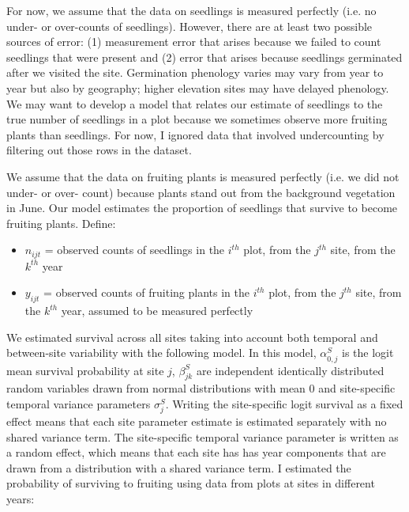 \documentclass[12pt, oneside, titlepage]{article}   	%
\begin{document}
For now, we assume that the data on seedlings is measured perfectly (i.e. no under- or over-counts of seedlings). However, there are at least two possible sources of error: (1) measurement error that arises because we failed to count seedlings that were present and (2) error that arises because seedlings germinated after we visited the site. Germination phenology varies may vary from year to year but also by geography; higher elevation sites may have delayed phenology. We may want to develop a model that relates our estimate of seedlings to the true number of seedlings in a plot because we sometimes observe more fruiting plants than seedlings. For now, I ignored data that involved undercounting by filtering out those rows in the dataset.

We assume that the data on fruiting plants is measured perfectly (i.e. we did not under- or over- count) because plants stand out from the background vegetation in June. Our model estimates the proportion of seedlings that survive to become fruiting plants. Define:

\begin{itemize}
	\item $n_{ijt}$ = observed counts of seedlings in the $i^{th}$ plot, from the $j^{th}$ site, from the $k^{th}$ year
	\item $y_{ijt}$ = observed counts of fruiting plants in the $i^{th}$ plot, from the $j^{th}$ site, from the $k^{th}$ year, assumed to be measured perfectly
\end{itemize}

We estimated survival across all sites taking into account both temporal and between-site variability with the following model. In this model, $\alpha^S_{0,j}$ is the logit mean survival probability at site $j$, $\beta^S_{jk}$ are independent identically distributed random variables drawn from normal distributions with mean 0 and site-specific temporal variance parameters $\sigma_j^S$. Writing the site-specific logit survival as a fixed effect means that each site parameter estimate is estimated separately with no shared variance term. The site-specific temporal variance parameter is written as a random effect, which means that each site has has year components that are drawn from a distribution with a shared variance term. I estimated the probability of surviving to fruiting using data from plots at sites in different years:
\end{document}
